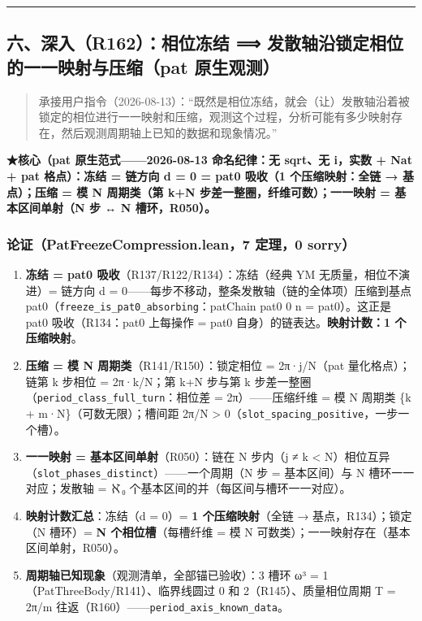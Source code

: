 \documentclass[
]{article}
\providecommand{\tightlist}{%
  \setlength{\itemsep}{0pt}\setlength{\parskip}{0pt}}
\begin{document}
\begin{center}\rule{0.5\linewidth}{0.5pt}\end{center}

\subsection{六、深入（R162）：相位冻结 ⟹
发散轴沿锁定相位的一一映射与压缩（pat
原生观测）}\label{ux516dux6df1ux5165r162ux76f8ux4f4dux51bbux7ed3-ux53d1ux6563ux8f74ux6cbfux9501ux5b9aux76f8ux4f4dux7684ux4e00ux4e00ux6620ux5c04ux4e0eux538bux7f29pat-ux539fux751fux89c2ux6d4b}

\begin{quote}
承接用户指令（2026-08-13）：``既然是相位冻结，就会（让）发散轴沿着被锁定的相位进行一一映射和压缩，观测这个过程，分析可能有多少映射存在，然后观测周期轴上已知的数据和现象情况。''
\end{quote}

\textbf{★核心（pat 原生范式------2026-08-13 命名纪律：无 sqrt、无
i，实数 + Nat + pat 格点）：冻结 = 链方向 d = 0 = pat0 吸收（1
个压缩映射：全链 → 基点）；压缩 = 模 N 周期类（第 k+N
步差一整圈，纤维可数）；一一映射 = 基本区间单射（N 步 ↔ N
槽环，R050）。}

\subsubsection{论证（PatFreezeCompression.lean，7 定理，0
sorry）}\label{ux8bbaux8bc1patfreezecompression.lean7-ux5b9aux74060-sorry}

\begin{enumerate}
\def\labelenumi{\arabic{enumi}.}
\tightlist
\item
  \textbf{冻结 = pat0 吸收}（R137/R122/R134）：冻结（经典 YM
  无质量，相位不演进）= 链方向 d =
  0------每步不移动，整条发散轴（链的全体项）压缩到基点
  pat0（\texttt{freeze\_is\_pat0\_absorbing}：patChain pat0 0 n =
  pat0）。这正是 pat0 吸收（R134：pat0 上每操作 = pat0
  自身）的链表达。\textbf{映射计数：1 个压缩映射}。
\item
  \textbf{压缩 = 模 N 周期类}（R141/R150）：锁定相位 = 2π·j/N（pat
  量化格点）；链第 k 步相位 = 2π·k/N；第 k+N 步与第 k
  步差一整圈（\texttt{period\_class\_full\_turn}：相位差 =
  2π）------压缩纤维 = 模 N 周期类 \{k + m·N\}（可数无限）；槽间距 2π/N
  \textgreater{} 0（\texttt{slot\_spacing\_positive}，一步一个槽）。
\item
  \textbf{一一映射 = 基本区间单射}（R050）：链在 N 步内（j ≠ k
  \textless{}
  N）相位互异（\texttt{slot\_phases\_distinct}）------一个周期（N 步 =
  基本区间）与 N 槽环一一对应；发散轴 = ℵ₀
  个基本区间的并（每区间与槽环一一对应）。
\item
  \textbf{映射计数汇总}：冻结（d = 0）= \textbf{1 个压缩映射}（全链 →
  基点，R134）；锁定（N 槽环）= \textbf{N 个相位槽}（每槽纤维 = 模 N
  可数类）；一一映射存在（基本区间单射，R050）。
\item
  \textbf{周期轴已知现象}（观测清单，全部锚已验收）：3 槽环 ω³ =
  1（PatThreeBody/R141）、临界线圆过 0 和 2（R145）、质量相位周期 T =
  2π/m 往返（R160）------\texttt{period\_axis\_known\_data}。
\end{enumerate}
\end{document}
